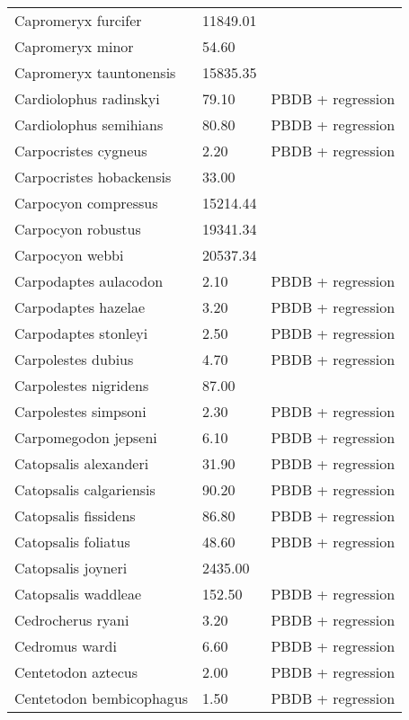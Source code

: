 \begin{longtable}{p{} p{} p{}}
    Capromeryx furcifer & 11849.01 & \cite{Tomiya2013} \\ 
    Capromeryx minor & 54.60 & \cite{Smith2004} \\ 
    Capromeryx tauntonensis & 15835.35 & \cite{Tomiya2013} \\ 
    Cardiolophus radinskyi & 79.10 & PBDB + regression \\ 
    Cardiolophus semihians & 80.80 & PBDB + regression \\ 
    Carpocristes cygneus & 2.20 & PBDB + regression \\ 
    Carpocristes hobackensis & 33.00 & \cite{Soligo2006} \\ 
    Carpocyon compressus & 15214.44 & \cite{Tomiya2013} \\ 
    Carpocyon robustus & 19341.34 & \cite{Tomiya2013} \\ 
    Carpocyon webbi & 20537.34 & \cite{Tomiya2013} \\ 
    Carpodaptes aulacodon & 2.10 & PBDB + regression \\ 
    Carpodaptes hazelae & 3.20 & PBDB + regression \\ 
    Carpodaptes stonleyi & 2.50 & PBDB + regression \\ 
    Carpolestes dubius & 4.70 & PBDB + regression \\ 
    Carpolestes nigridens & 87.00 & \cite{Scott2003a} \\ 
    Carpolestes simpsoni & 2.30 & PBDB + regression \\ 
    Carpomegodon jepseni & 6.10 & PBDB + regression \\ 
    Catopsalis alexanderi & 31.90 & PBDB + regression \\ 
    Catopsalis calgariensis & 90.20 & PBDB + regression \\ 
    Catopsalis fissidens & 86.80 & PBDB + regression \\ 
    Catopsalis foliatus & 48.60 & PBDB + regression \\ 
    Catopsalis joyneri & 2435.00 & \cite{Wilson2012} \\ 
    Catopsalis waddleae & 152.50 & PBDB + regression \\ 
    Cedrocherus ryani & 3.20 & PBDB + regression \\ 
    Cedromus wardi & 6.60 & PBDB + regression \\ 
    Centetodon aztecus & 2.00 & PBDB + regression \\ 
    Centetodon bembicophagus & 1.50 & PBDB + regression \\ 

\end{longtable}
